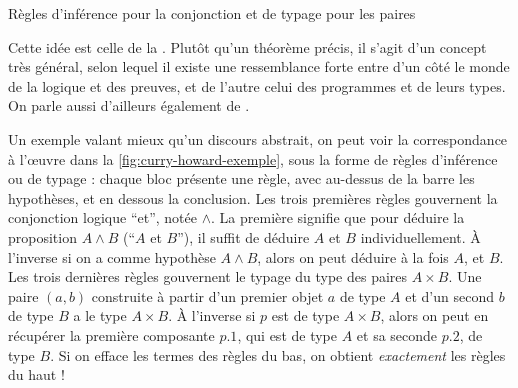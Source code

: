 \begin{marginfigure}[2em]




  
  \caption{Règles d’inférence pour la conjonction et de typage pour les paires}
  \label{fig:curry-howard-exemple}
\end{marginfigure}

Cette idée est celle de la .
Plutôt qu’un théorème précis, il s’agit d’un concept très général,
selon lequel il existe une ressemblance forte entre d’un côté le monde de la
logique et des preuves, et de l’autre celui des programmes et de leurs types.
On parle aussi d’ailleurs également de .

Un exemple valant mieux qu’un discours abstrait, on peut voir la correspondance à l’œuvre dans la \cref{fig:curry-howard-exemple}, sous la forme de règles d’inférence
ou de typage : chaque bloc présente une règle, avec au-dessus de la barre les
hypothèses, et en dessous la conclusion.
Les trois premières règles gouvernent la conjonction logique “et”, notée $\wedge$.
La première signifie que pour déduire la proposition $A \wedge B$ (“$A$ et $B$”),
il suffit de déduire $A$ et $B$ individuellement.
À l’inverse si on a comme hypothèse $A \wedge B$, alors on peut déduire à la fois $A$, et $B$.
Les trois dernières règles gouvernent le typage du type des paires $A \times B$.
Une paire $(a,b)$ construite à partir d’un premier objet $a$ de type $A$ et d’un second $b$
de type $B$ a le type $A \times B$.
À l’inverse si $p$ est de type $A \times B$, alors on peut en récupérer la première composante
$p.1$, qui est de type $A$ et sa seconde $p.2$, de type $B$.
Si on efface les termes des règles du bas, on obtient \emph{exactement} les règles du haut !

